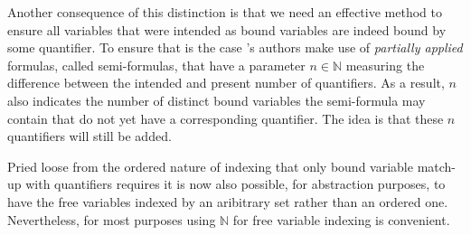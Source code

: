 Another consequence of this distinction is that we need an effective method to ensure all variables that were intended as bound variables are indeed bound by some quantifier. To ensure that is the case \cite{ffl}'s authors make use of \textit{partially applied} formulas, called semi-formulas, that have a parameter $n \in \mathbb{N}$ measuring the difference between the intended and present number of quantifiers. As a result, $n$ also indicates the number of distinct bound variables the semi-formula may contain that do not yet have a corresponding quantifier. The idea is that these $n$ quantifiers will still be added. 

Pried loose from the ordered nature of indexing that only bound variable match-up with quantifiers requires it is now also possible, for abstraction purposes, to have the free variables indexed by an aribitrary set rather than an ordered one. Nevertheless, for most purposes using $\mathbb{N}$ for free variable indexing is convenient.



